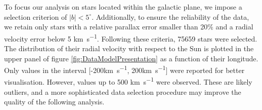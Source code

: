 To focus our analysis on stars located within the galactic plane, we impose a selection criterion of $\vert b \vert < 5^{\circ}$. 
Additionally, to ensure the reliability of the data, we retain only stars with a relative parallax error smaller than 20$\%$ 
and a radial velocity error below 5 \unit{\kilo\meter\per\second}. 
Following these criteria, 75659 stars were selected. The distribution of their radial velocity 
with respect to the Sun is plotted in the upper panel of figure \ref{fig:DataModelPresentation} 
as a function of their longitude. Only values in the interval 
[-200\unit{\kilo\meter\per\second}, 200\unit{\kilo\meter\per\second}] were reported for better visualisation. 
However, values up to 500 \unit{\kilo\meter\per\second} were observed. 
These are likely outliers, and a more sophisticated data selection procedure may improve the quality of the following analysis.

